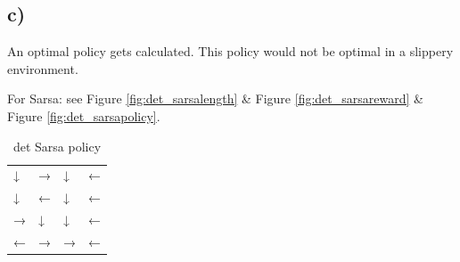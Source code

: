 \documentclass[a4paper]{article}
\begin{document}
\newpage
\subsection*{c)}

An optimal policy gets calculated. This policy would not be optimal in a slippery environment.

For Sarsa: see Figure \ref{fig:det_sarsalength} \& Figure \ref{fig:det_sarsareward} \& Figure \ref{fig:det_sarsapolicy}.

\begin{table}[!ht]
	\centering
	\begin{tabular}{llll}
		↓ & → & ↓ & ← \\
		↓ & ← & ↓ & ← \\
		→ & ↓ & ↓ & ← \\
		← & → & → & ←
	\end{tabular}
	\caption{det Sarsa policy}
\end{table}
\end{document}
